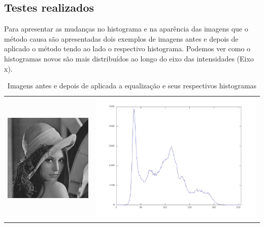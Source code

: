 \documentclass[brazil,times]{abnt}
\begin{document}
		\subsection{Testes realizados}
			Para apresentar as mudanças no histograma e na aparência das imagens que o método causa são apresentadas dois exemplos de imagens antes e depois de aplicado o método tendo ao lado o respectivo histograma. Podemos ver como o histogramas novos são mais distribuídos ao longo do eixo das intensidades (Eixo x).
			
			\begin{table}[ht]
			\caption{Imagens antes e depois de aplicada a equalização e seus respectivos histogramas}
			\centering
			\begin{tabular}{|c|c|}
			\hline
			\includegraphics[scale=0.25]{imagens/lena.jpg}&\includegraphics[scale=0.15]{imagens/lena-hist-original.jpg}\\

\end{tabular}
\end{table}
\end{document}
